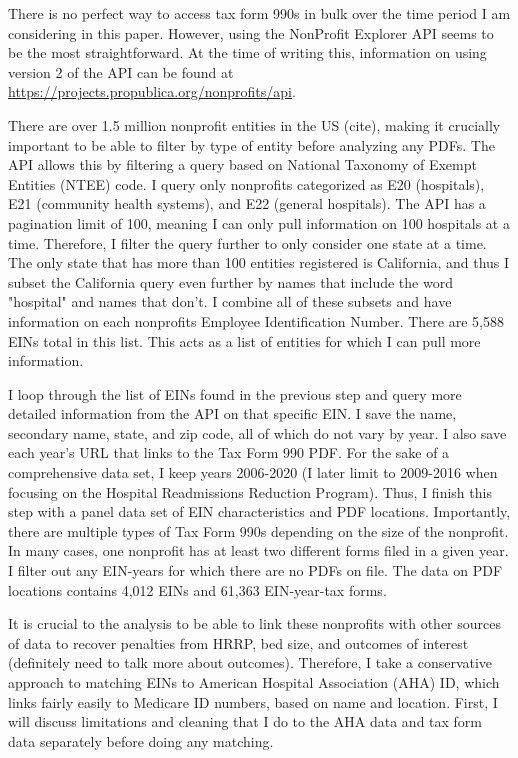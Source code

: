 \documentclass[12pt]{article}
\begin{document}
There is no perfect way to access tax form 990s in bulk over the time period I am considering in this paper. However, using the NonProfit Explorer API seems to be the most straightforward. At the time of writing this, information on using version 2 of the API can be found at \hyperlink{https://projects.propublica.org/nonprofits/api}{https://projects.propublica.org/nonprofits/api}. 
    
There are over 1.5 million nonprofit entities in the US (cite), making it crucially important to be able to filter by type of entity before analyzing any PDFs. The API allows this by filtering a query based on National Taxonomy of Exempt Entities (NTEE) code. I query only nonprofits categorized as E20 (hospitals), E21 (community health systems), and E22 (general hospitals). The API has a pagination limit of 100, meaning I can only pull information on 100 hospitals at a time. Therefore, I filter the query further to only consider one state at a time. The only state that has more than 100 entities registered is California, and thus I subset the California query even further by names that include the word "hospital" and names that don't. I combine all of these subsets and have information on each nonprofits Employee Identification Number. There are 5,588 EINs total in this list. This acts as a list of entities for which I can pull more information. 

I loop through the list of EINs found in the previous step and query more detailed information from the API on that specific EIN. I save the name, secondary name, state, and zip code, all of which do not vary by year. I also save each year's URL that links to the Tax Form 990 PDF. For the sake of a comprehensive data set, I keep years 2006-2020 (I later limit to 2009-2016 when focusing on the Hospital Readmissions Reduction Program). Thus, I finish this step with a panel data set of EIN characteristics and PDF locations. Importantly, there are multiple types of Tax Form 990s depending on the size of the nonprofit. In many cases, one nonprofit has at least two different forms filed in a given year. I filter out any EIN-years for which there are no PDFs on file. The data on PDF locations contains 4,012 EINs and 61,363 EIN-year-tax forms.

It is crucial to the analysis to be able to link these nonprofits with other sources of data to recover penalties from HRRP, bed size, and outcomes of interest (definitely need to talk more about outcomes). Therefore, I take a conservative approach to matching EINs to American Hospital Association (AHA) ID, which links fairly easily to Medicare ID numbers, based on name and location. First, I will discuss limitations and cleaning that I do to the AHA data and tax form data separately before doing any matching. 
\end{document}
